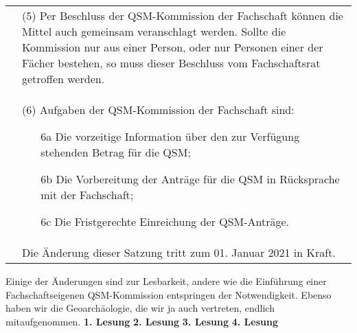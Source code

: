 {\begin{longtable}{|p{7.5cm}|p{7.5cm}|}
        &(5) Per Beschluss der QSM-Kommission der Fachschaft können die Mittel auch gemeinsam
        veranschlagt werden. Sollte die Kommission nur aus einer Person, oder nur Personen
        einer der Fächer bestehen, so muss dieser Beschluss vom Fachschaftsrat getroffen
        werden. \\
        &(6) Aufgaben der QSM-Kommission der Fachschaft sind: 
        \begin{itemize}
        \item[6a] Die vorzeitige Information über den zur Verfügung stehenden Betrag für die QSM;
        \item[6b]Die Vorbereitung der Anträge für die QSM in Rücksprache mit der Fachschaft;
        \item[6c]   Die Fristgerechte Einreichung der QSM-Anträge.
        \end{itemize}\\
        & Die Änderung dieser Satzung tritt zum 01. Januar 2021 in Kraft.\\
    \end{longtable}
}{
    Einige der Änderungen sind zur Lesbarkeit, andere wie die Einführung einer Fachschaftseigenen QSM-Kommission entspringen der Notwendigkeit. Ebenso haben wir die Geoarchäologie, die wir ja auch vertreten, endlich mitaufgenommen.
}{
    \textbf{1. Lesung}
    \ul{
    }
    \textbf{2. Lesung}
    \ul{
    }
    \textbf{3. Lesung}
    \ul{
    }
    \textbf{4. Lesung}
    \ul{
    }
}{

}

